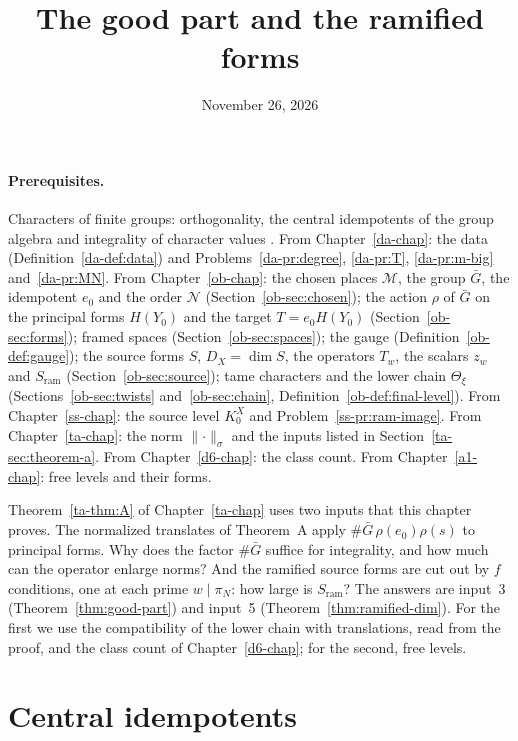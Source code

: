 \documentclass[reqno]{amsart}
\title{The good part and the ramified forms}
\author{}
\date{November 26, 2026}
\newcounter{chap}
\theoremstyle{definition}
\theoremstyle{plain}
\theoremstyle{definition}
\newcommand{\Gb}{\bar G}
\newcommand{\Sram}{S_{\mathrm{ram}}}
\newcommand{\Nc}{\mathcal N}
\begin{document}
\maketitle
{}\label{chap}

\paragraph{Prerequisites.}
Characters of finite groups: orthogonality, the central idempotents of the group algebra and integrality of character values \cite{Se}.  From Chapter~\ref{da-chap}: the data (Definition~\ref{da-def:data}) and Problems~\ref{da-pr:degree}, \ref{da-pr:T}, \ref{da-pr:m-big} and~\ref{da-pr:MN}.  From Chapter~\ref{ob-chap}: the chosen places \(\mathcal M\), the group \(\Gb\), the idempotent \(e_0\) and the order \(\Nc\) (Section~\ref{ob-sec:chosen}); the action \(\rho\) of \(\Gb\) on the principal forms \(H(Y_0)\) and the target \(T = e_0H(Y_0)\) (Section~\ref{ob-sec:forms}); framed spaces (Section~\ref{ob-sec:spaces}); the gauge (Definition~\ref{ob-def:gauge}); the source forms \(S\), \(D_X = \dim S\), the operators \(T_w\), the scalars \(z_w\) and \(\Sram\) (Section~\ref{ob-sec:source}); tame characters and the lower chain \(\Theta_\xi\) (Sections~\ref{ob-sec:twists} and~\ref{ob-sec:chain}, Definition~\ref{ob-def:final-level}).  From Chapter~\ref{ss-chap}: the source level \(K^X_0\) and Problem~\ref{ss-pr:ram-image}.  From Chapter~\ref{ta-chap}: the norm \(\lVert\cdot\rVert_\sigma\) and the inputs listed in Section~\ref{ta-sec:theorem-a}.  From Chapter~\ref{d6-chap}: the class count.  From Chapter~\ref{a1-chap}: free levels and their forms.

\medskip
Theorem~\ref{ta-thm:A} of Chapter~\ref{ta-chap} uses two inputs that this chapter proves.  The normalized translates of Theorem~A apply \(\#\Gb\,\rho(e_0)\rho(s)\) to principal forms.  Why does the factor \(\#\Gb\) suffice for integrality, and how much can the operator enlarge norms?  And the ramified source forms are cut out by \(f\) conditions, one at each prime \(w \mid \pi_N\): how large is \(\Sram\)?  The answers are input~3 (Theorem~\ref{thm:good-part}) and input~5 (Theorem~\ref{thm:ramified-dim}).  For the first we use the compatibility of the lower chain with translations, read from the proof, and the class count of Chapter~\ref{d6-chap}; for the second, free levels.

\section{Central idempotents}\label{sec:idempotents}
\end{document}
